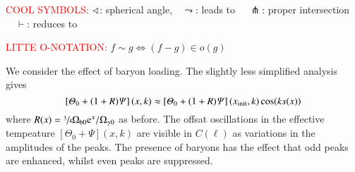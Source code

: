     \textcolor{red}{COOL SYMBOLS:} $\sphericalangle $: spherical angle,$\quad \leadsto $: leads to $\quad\pitchfork$: proper intersection $\quad \vdash$: reduces to


    \textcolor{red}{LITTE O-NOTATION:} $f\sim g \Leftrightarrow (f-g)\in o(g)$
    
    
    




    
    We consider the effect of baryon loading. The slightly less simplified analysis gives
    \begin{equation}
        \left[\varTheta_0 +(1+R) \varPsi\right](x, k) \approx \left[\varTheta_0 + (1+R)\varPsi\right](x_\mathrm{init}, k)\cos(ks(x)) 
    \end{equation}
    where $R(x) = \sfrac{3}{4}\Omega\ped{b0} \eu[x]/\Omega\ped{\gamma 0}$ as before. The offsat oscillations in the effective tempeature $\left[\Theta_0 +\Psi\right](x, k)$ are visible in $C(\ell)$ as variations in the amplitudes of the peaks. The presence of baryons has the effect that odd peaks are enhanced, whilst even peaks are suppressed. 

